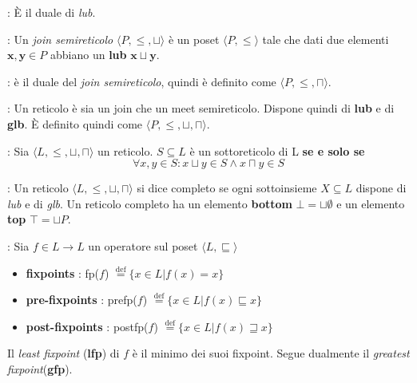 \documentclass[a4paper, 10pt]{book}
\newenvironment{definition}[1][Definizione]{\begin{trivlist}
\item[\hskip \labelsep {\bfseries #1}]}{\end{trivlist}}
\begin{document}
    \begin{definition}[Greatest lower bound (\textbf{glb})]: È il  duale di \emph{lub}.
    \end{definition}
    
    \begin{definition}[Join semireticolo]: Un \emph{join semireticolo} $\langle P, \leq, \sqcup \rangle$ è un poset
            $\langle P, \leq \rangle$ tale che dati due elementi $\mathbf{x}, \mathbf{y} \in P$ abbiano
            un \textbf{lub} $\mathbf{x} \sqcup \mathbf{y}$.
    \end{definition}
    
    \begin{definition}[Meet semireticolo]: è il duale del \textit{join semireticolo}, quindi è definito come 
        $\langle P, \leq, \sqcap \rangle$.
    \end{definition}
    
    \begin{definition}[Reticolo]: Un reticolo è sia un join che un meet semireticolo. Dispone quindi di \textbf{lub}
            e di \textbf{glb}. È definito quindi come $\langle P, \leq, \sqcup, \sqcap \rangle$.
    \end{definition}
    
    \begin{definition}[Sottoreticolo]: Sia $\langle L, \leq, \sqcup, \sqcap \rangle$ un reticolo. $S \subseteq L$ è un 
        sottoreticolo di L \textbf{se e solo se} 
        $$\forall x,y \in S : x \sqcup y \in S \land x \sqcap y \in S$$
    \end{definition}
    
    \begin{definition}[Reticolo completo]: Un reticolo $\langle L, \leq, \sqcup, \sqcap \rangle$ si dice completo se
            ogni sottoinsieme $X \subseteq L$ dispone di \emph{lub} e di \emph{glb}. Un reticolo completo
            ha un elemento \textbf{bottom} $\bot = \sqcup \emptyset$ e un elemento \textbf{top} 
            $\top = \sqcup P$.
    \end{definition}
    
    \begin{definition}[Punti fissi]: Sia $f \in L \to L $ un operatore sul poset
            $\langle L, \sqsubseteq \rangle$
        \begin{itemize}
            \item \textbf{fixpoints} : fp($f$) $\overset{\mathrm{def}}{=} \{x \in L | f(x) = x\}$
            \item \textbf{pre-fixpoints} : prefp($f$) $\overset{\mathrm{def}}{=} \{x \in L | f(x) 
                \sqsubseteq x\}$
            \item \textbf{post-fixpoints} : postfp($f$) $\overset{\mathrm{def}}{=} \{x \in L | f(x) 
                \sqsupseteq x\}$
        \end{itemize}
            Il \emph{least fixpoint} (\textbf{lfp}) di $f$ è il minimo dei suoi fixpoint. Segue dualmente il 
            \emph{greatest fixpoint}(\textbf{gfp}).
    \end{definition}
    
\end{document}
